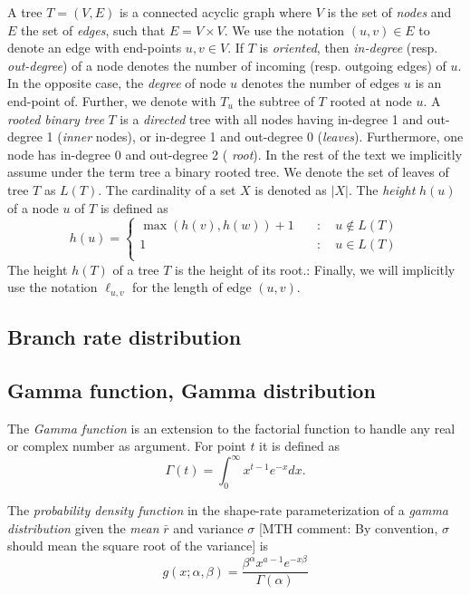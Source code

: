 \documentclass{llncs}
\newcommand{\mthcomment}[1]{{[\color{red}MTH comment: #1]}}
\begin{document}
A tree $T=(V,E)$ is a connected acyclic graph where $V$ is the set of {\em
nodes} and $E$ the set of {\em edges}, such that $E = V\times V$. We use the
notation $(u,v) \in E$ to denote an edge with end-points $u,v \in V$. If $T$ is
{\em oriented}, then {\em in-degree} (resp. {\em out-degree}) of a node denotes
the number of incoming (resp. outgoing edges) of $u$. In the opposite case, the
{\em degree} of node $u$ denotes the number of edges $u$ is an end-point of.
Further, we denote with $T_u$ the subtree of $T$ rooted at node $u$.  A {\em
rooted binary tree} $T$ is a {\em directed} tree with all nodes having
in-degree 1 and out-degree 1 ({\em inner} nodes), or in-degree 1 and out-degree
0 ({\em leaves}). Furthermore, one node has in-degree 0 and out-degree 2 ({\em
root}).  In the rest of the text we implicitly assume under the term tree a
binary rooted tree.  We denote the set of leaves of tree $T$ as $L(T)$.  The
cardinality of a set $X$ is denoted as $|X|$. The {\em height} $h(u)$ of a node
$u$ of $T$ is defined as 
%
\[ h(u) = \left\{ \begin{array}{ll}
\max(h(v), h(w)) + 1 & \quad : \quad u \notin L(T)\\
1                    & \quad : \quad u    \in L(T)\\
\end{array}\right. \] 
The height $h(T)$ of a tree $T$ is the height of its root.: Finally, we will
implicitly use the notation $\ell_{u,v}$ for the length of edge $(u,v)$.

\subsection{Branch rate distribution}
\subsection{Gamma function, Gamma distribution}

The {\em Gamma function} is an extension to the factorial function to handle
any real or complex number as argument. For point $t$ it is defined as
$$\Gamma(t) = \int_0^\infty x^{t-1} e^{-x} dx.$$

The {\em probability density function} in the shape-rate parameterization of a
{\em gamma distribution} given the {\em mean} $\bar{r}$ and variance $\sigma$ \mthcomment{By convention, $\sigma$ should 
mean the square root of the variance} is
$$ g(x;\alpha,\beta) = \frac{\beta^{\alpha}x^{a-1}e^{-x\beta}}{\Gamma(\alpha)} $$
\end{document}
